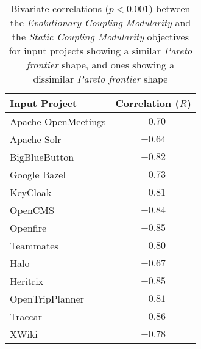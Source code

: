\documentclass[12pt,a4paper]{report}
\begin{document}
\begin{table}[h!]
\def\arraystretch{1.55}
\begin{tabularx}{\textwidth}{|X|c|}
\hline
Input Project & Correlation ($R$) \\
\hline\hline

Apache OpenMeetings & $-0.70$  \\\hline
Apache Solr         & $-0.64$  \\\hline
BigBlueButton       & $-0.82$  \\\hline
Google Bazel        & $-0.73$  \\\hline
KeyCloak            & $-0.81$  \\\hline
OpenCMS             & $-0.84$  \\\hline
Openfire            & $-0.85$  \\\hline
Teammates           & $-0.80$  \\\hline
\hline\hline
Halo                & $-0.67$  \\\hline
Heritrix            & $-0.85$  \\\hline
OpenTripPlanner     & $-0.81$  \\\hline
Traccar             & $-0.86$  \\\hline
XWiki               & $-0.78$  \\\hline

\end{tabularx}
\caption{Bivariate correlations ($p < 0.001$) between the \textit{Evolutionary Coupling Modularity} and the \textit{Static Coupling Modularity} objectives for input projects showing a similar \textit{Pareto frontier} shape, and ones showing a dissimilar \textit{Pareto frontier} shape}
\label{table:experiment-4.2}
\end{table}
\end{document}
